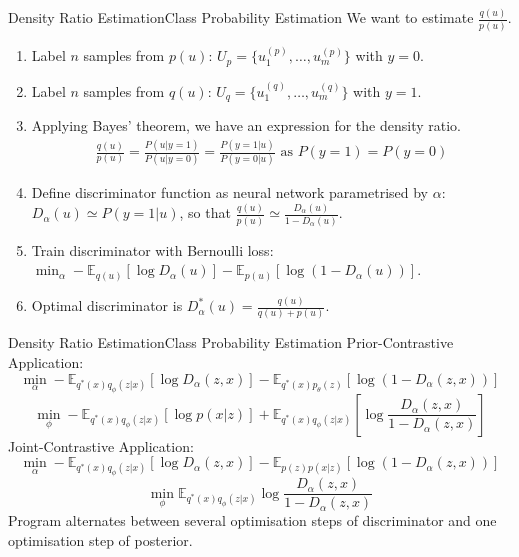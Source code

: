 \documentclass{beamer}
\begin{document}
\begin{frame}{Density Ratio Estimation}{Class Probability Estimation}
We want to estimate $\frac{q(u)}{p(u)}$.
  \begin{enumerate}

  \item {
    Label $n$ samples from $p(u)$: $U_p=\{u_1^{(p)},\dots,u_m^{(p)}\}$ with $y=0$.
  }
  \item {   
    Label $n$ samples from $q(u)$: $U_q=\{u_1^{(q)},\dots,u_m^{(q)}\}$ with $y=1$.
  }
  \item {
    Applying Bayes' theorem, we have an expression for the density ratio.
  }
  \begin{align*}
  \frac{q(u)}{p(u)}=\frac{P(u|y=1)}{P(u|y=0)}=\frac{P(y=1|u)}{P(y=0|u)} \text{ as }P(y=1)=P(y=0)
  \end{align*}
  \item {
    Define discriminator function as neural network parametrised by $\alpha$: $D_\alpha(u)\simeq P(y=1|u)$, so that $\frac{q(u)}{p(u)}\simeq \frac{D_\alpha(u)}{1-D_\alpha(u)}$.
  }
  \item {
    Train discriminator with Bernoulli loss: $\min_\alpha -\mathbb{E}_{q(u)}[\log D_\alpha(u)]-\mathbb{E}_{p(u)}[\log(1-D_\alpha(u))]$.
  }
  \item Optimal discriminator is $D^*_\alpha(u)=\frac{q(u)}{q(u)+p(u)}$.
  \end{enumerate}
\end{frame}
\begin{frame}{Density Ratio Estimation}{Class Probability Estimation}
Prior-Contrastive Application:
\[\min_\alpha -\mathbb{E}_{q^*(x)q_\phi(z|x)}[\log D_\alpha(z,x)]-\mathbb{E}_{q^*(x)p_\theta(z)}[\log (1-D_\alpha(z,x))]\]
\[\min_\phi -\mathbb{E}_{q^*(x)q_\phi(z|x)}[\log p(x|z)]+\mathbb{E}_{q^*(x)q_\phi(z|x)}\left[\log \frac{D_\alpha(z,x)}{1-D_\alpha(z,x)}\right]\]
Joint-Contrastive Application:
\[\min_\alpha -\mathbb{E}_{q^*(x)q_\phi(z|x)}[\log D_\alpha(z,x)]-\mathbb{E}_{p(z)p(x|z)}[\log (1-D_\alpha(z,x))]\]
\[\min_\phi \mathbb{E}_{q^*(x)q_\phi(z|x)}\log\frac{D_\alpha(z,x)}{1-D_\alpha(z,x)}\]
Program alternates between several optimisation steps of discriminator and one optimisation step of posterior.
\end{frame}
\end{document}
